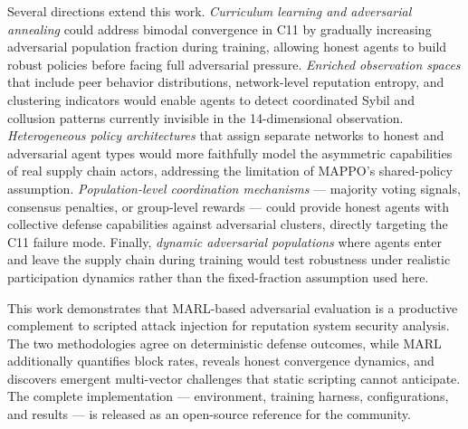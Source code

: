 Several directions extend this work.  \emph{Curriculum learning and
adversarial annealing} could address bimodal convergence in C11 by gradually
increasing adversarial population fraction during training, allowing honest
agents to build robust policies before facing full adversarial pressure.
\emph{Enriched observation spaces} that include peer behavior distributions,
network-level reputation entropy, and clustering indicators would enable
agents to detect coordinated Sybil and collusion patterns currently invisible
in the 14-dimensional observation.  \emph{Heterogeneous policy architectures}
that assign separate networks to honest and adversarial agent types would
more faithfully model the asymmetric capabilities of real supply chain actors,
addressing the limitation of MAPPO's shared-policy assumption.
\emph{Population-level coordination mechanisms} --- majority voting signals,
consensus penalties, or group-level rewards --- could provide honest agents
with collective defense capabilities against adversarial clusters, directly
targeting the C11 failure mode.  Finally, \emph{dynamic adversarial
populations} where agents enter and leave the supply chain during training
would test robustness under realistic participation dynamics rather than the
fixed-fraction assumption used here.

This work demonstrates that MARL-based adversarial evaluation is a
productive complement to scripted attack injection for reputation system
security analysis.  The two methodologies agree on deterministic defense
outcomes, while MARL additionally quantifies block rates, reveals honest
convergence dynamics, and discovers emergent multi-vector challenges that
static scripting cannot anticipate.  The complete implementation ---
environment, training harness, configurations, and results --- is released
as an open-source reference for the community.
